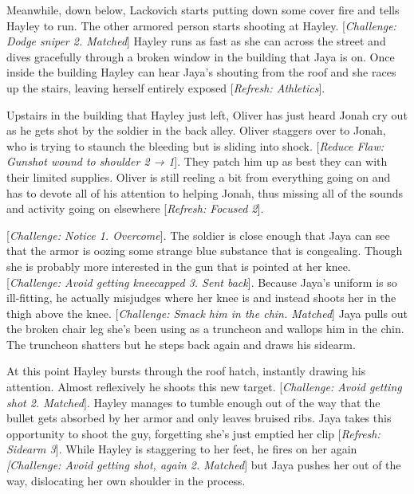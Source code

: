 
Meanwhile, down below, Lackovich starts putting down some cover fire and tells Hayley to run.  The other armored person starts shooting at Hayley.  {[}\textit{Challenge: Dodge sniper 2. Matched}{]}  Hayley runs as fast as she can across the street and dives gracefully through a broken window in the building that Jaya is on.  Once inside the building Hayley can hear Jaya's shouting from the roof and she races up the stairs, leaving herself entirely exposed {[}\textit{Refresh: Athletics}{]}.



Upstairs in the building that Hayley just left, Oliver has just heard Jonah cry out as he gets shot by the soldier in the back alley.  Oliver staggers over to Jonah, who is trying to staunch the bleeding but is sliding into shock.  {[}\textit{Reduce Flaw: Gunshot wound to shoulder 2 → 1}{]}.  They patch him up as best they can with their limited supplies.  Oliver is still reeling a bit from everything going on and has to devote all of his attention to helping Jonah, thus missing all of the sounds and activity going on elsewhere {[}\textit{Refresh: Focused 2}{]}.



{[}\textit{Challenge: Notice 1. Overcome}{]}. The soldier is close enough that Jaya can see that the armor is oozing some strange blue substance that is congealing.  Though she is probably more interested in the gun that is pointed at her knee.  {[}\textit{Challenge: Avoid getting kneecapped 3.  Sent back}{]}.  Because Jaya's uniform is so ill-fitting, he actually misjudges where her knee is and instead shoots her in the thigh above the knee.  {[}\textit{Challenge: Smack him in the chin.  Matched}{]} Jaya pulls out the broken chair leg she's been using as a truncheon and wallops him in the chin.  The truncheon shatters but he steps back again and draws his sidearm.



At this point Hayley bursts through the roof hatch, instantly drawing his attention.  Almost reflexively he shoots this new target.  {[}\textit{Challenge: Avoid getting shot 2.  Matched}{]}.   Hayley manages to tumble enough out of the way that the bullet gets absorbed by her armor and only leaves bruised ribs.  Jaya takes this opportunity to shoot the guy, forgetting she's just emptied her clip {[}\textit{Refresh: Sidearm 3}{]}.  While Hayley is staggering to her feet, he fires on her again \textit{{[}Challenge: Avoid getting shot, again 2.  Matched}{]} but Jaya pushes her out of the way, dislocating her own shoulder in the process. 



